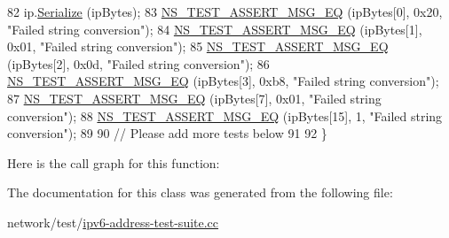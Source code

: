 \begin{DoxyCode}
82   ip.\hyperlink{classns3_1_1Ipv6Address_adf5b453892de2893a371380ab299db88}{Serialize} (ipBytes);
83   \hyperlink{group__testing_ga2a9d78cffb3db8e867c35fff0b698cf5}{NS\_TEST\_ASSERT\_MSG\_EQ} (ipBytes[0], 0x20, \textcolor{stringliteral}{"Failed string conversion"});
84   \hyperlink{group__testing_ga2a9d78cffb3db8e867c35fff0b698cf5}{NS\_TEST\_ASSERT\_MSG\_EQ} (ipBytes[1], 0x01, \textcolor{stringliteral}{"Failed string conversion"});
85   \hyperlink{group__testing_ga2a9d78cffb3db8e867c35fff0b698cf5}{NS\_TEST\_ASSERT\_MSG\_EQ} (ipBytes[2], 0x0d, \textcolor{stringliteral}{"Failed string conversion"});
86   \hyperlink{group__testing_ga2a9d78cffb3db8e867c35fff0b698cf5}{NS\_TEST\_ASSERT\_MSG\_EQ} (ipBytes[3], 0xb8, \textcolor{stringliteral}{"Failed string conversion"});
87   \hyperlink{group__testing_ga2a9d78cffb3db8e867c35fff0b698cf5}{NS\_TEST\_ASSERT\_MSG\_EQ} (ipBytes[7], 0x01, \textcolor{stringliteral}{"Failed string conversion"});
88   \hyperlink{group__testing_ga2a9d78cffb3db8e867c35fff0b698cf5}{NS\_TEST\_ASSERT\_MSG\_EQ} (ipBytes[15], 1, \textcolor{stringliteral}{"Failed string conversion"});
89 
90   \textcolor{comment}{// Please add more tests below}
91 
92 \}
\end{DoxyCode}


Here is the call graph for this function\+:




The documentation for this class was generated from the following file\+:\begin{DoxyCompactItemize}
\item 
network/test/\hyperlink{ipv6-address-test-suite_8cc}{ipv6-\/address-\/test-\/suite.\+cc}\end{DoxyCompactItemize}
